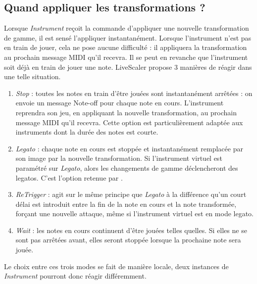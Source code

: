 \subsection{Quand appliquer les transformations ? }
Lorsque \emph{Instrument} reçoit la commande d'appliquer une nouvelle transformation de gamme, il est sensé l'appliquer instantanément. Lorsque l'instrument n'est pas en train de jouer, cela ne pose aucune difficulté : il appliquera la transformation au prochain message MIDI qu'il recevra. Il se peut en revanche que l'instrument soit déjà en train de jouer une note. LiveScaler propose $3$ manières de réagir dans une telle situation. 


\begin{enumerate}
  \item \emph{Stop} : toutes les notes en train d'être jouées sont instantanément arrêtées : on envoie un message Note-off pour chaque note en cours. L'instrument reprendra son jeu, en appliquant la nouvelle transformation, au prochain message MIDI qu'il recevra. Cette option est particulièrement adaptée aux instruments dont la durée des notes est courte. 
  \item \emph{Legato} : chaque note en cours est stoppée et instantanément remplacée par son image par la nouvelle transformation. Si l'instrument virtuel est paramétré sur \emph{Legato}, alors les changements de gamme déclencheront des legatos. C'est l'option retenue par \cite{Livingstone_Muhlberger_Brown_Thompson_2010}.
  \item \emph{ReTrigger} : agit sur le même principe que \emph{Legato} à la différence  qu'un court délai est introduit entre la fin de la note en cours et la note transformée, forçant une nouvelle attaque, même si l'instrument virtuel est en mode legato.
  \item \emph{Wait} : les notes en cours continuent d'être jouées telles quelles. Si elles ne se sont pas arrêtées avant, elles seront stoppée lorsque la prochaine note sera jouée.
\end{enumerate}

Le choix entre ces trois modes se fait de manière locale, deux instances de \emph{Instrument} pourront donc réagir différemment.
